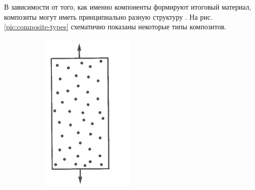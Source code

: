 В зависимости от того, как именно компоненты формируют итоговый материал, композиты могут иметь принципиально разную структуру \cite{bazhenov}. На рис. \ref{pic:composite-types} схематично показаны некоторые типы композитов.

\begin{figure}[h]
\centering
\begin{subfigure}[b]{0.2\textwidth}
\centering
\includegraphics[width=\textwidth]{png/composites-types-1.png}
\caption{ }
\end{subfigure}
\begin{subfigure}[b]{0.2\textwidth}

\end{subfigure}
\end{figure}
